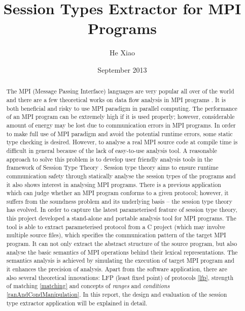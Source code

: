 \documentclass[twoside]{icldt}
\title{Session Types Extractor for MPI Programs}
\author{He Xiao}
\date{September 2013}
\begin{document}
\maketitle

\begin{abstract}
The MPI (Message Passing Interface) languages are very popular all over of the world and there are a few theoretical works on data flow analysis in MPI programs \cite{formalAnalysisOfMPI, pgmFlowGraph, pCFG, dataflow}. It is both beneficial and risky to use MPI paradigm in parallel computing. The performance of an MPI program can be extremely high if it is used properly; however, considerable amount of energy may be lost due to communication errors in MPI programs. In order to make full use of MPI paradigm and avoid the potential runtime errors, some static type checking is desired. However, to analyse a real MPI source code at compile time is difficult in general because of the lack of easy-to-use analysis tool.  A reasonable approach to solve this problem is to develop user friendly analysis tools in the framework of Session Type Theory \cite{Honda98lang, langRevisited}. Session type theory aims to ensure runtime communication safety through statically analyse the session types of the programs and it also shows interest in analysing MPI programs. There is a previous application \cite{prevProj} which can judge whether an MPI program conforms to a given protocol; however, it suffers from the soundness problem and its underlying basis -- the session type theory has evolved. In order to capture the latest parameterised feature \cite{parameterised} of session type theory, this project developed a stand-alone and portable analysis tool for MPI programs. The tool is able to extract parameterised protocol from a C project (which may involve multiple source files), which specifies the communication pattern of the target MPI program. It can not only extract the abstract structure of the source program, but also analyse the basic semantics of MPI operations behind their lexical representations. The semantics analysis is achieved by simulating the execution of target MPI program and it enhances the precision of analysis. Apart from the software application, there are also several theoretical innovations: LFP (least fixed point) of protocols \ref{lfp}, strength of matching \ref{matching} and concepts of \emph{ranges} and \emph{conditions} \ref{ranAndCondManipulation}. In this report, the design and evaluation of the session type extractor application will be explained in detail.
\end{abstract}
 
\end{document}

